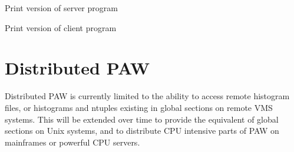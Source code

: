 \par
Print version of server program

\par
Print version of client program

\chapter{Distributed PAW}
\par
Distributed PAW is currently limited to the ability to access remote
histogram files, or histograms and ntuples existing in global
sections on remote VMS systems. This will be extended over time
to provide the equivalent of global sections on Unix systems,
and to distribute CPU intensive parts of PAW on
mainframes or powerful CPU servers.
